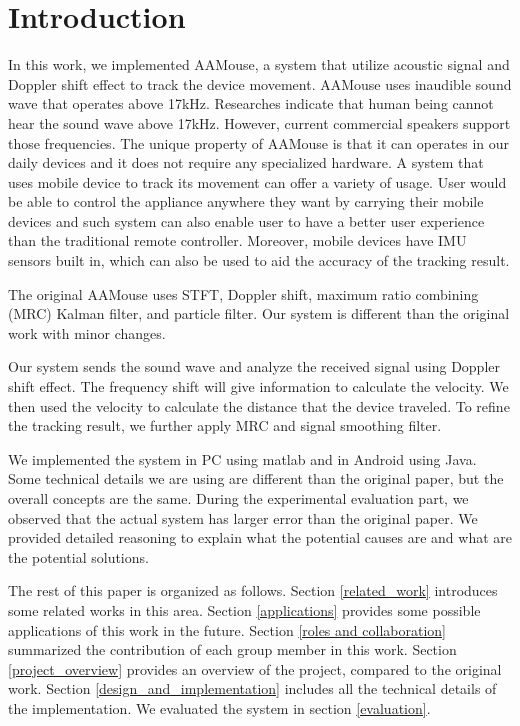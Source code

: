 \documentclass{acm_proc_article-sp}
\begin{document}
\section{Introduction}
In this work, we implemented AAMouse, a system that utilize 
acoustic signal and Doppler shift effect to track the device movement.
AAMouse uses inaudible sound wave that operates above 17kHz.
Researches indicate that human being cannot hear the sound wave above
17kHz. However, current commercial speakers support those frequencies.
The unique property of AAMouse is that it can operates in our daily 
devices and it does not require any specialized hardware. A system
that uses mobile device to track its movement can offer a variety
of usage. User would be able to control the appliance anywhere they
want by carrying their mobile devices and such system can also 
enable user to have a better user experience than the traditional
remote controller. Moreover, mobile devices have IMU sensors built in,
which can also be used to aid the accuracy of the tracking result.

The original AAMouse uses STFT, Doppler shift, maximum ratio 
combining (MRC) Kalman filter, and 
particle filter. Our system is different than the original work with
minor changes. 

Our system sends the sound wave and analyze the received signal using
Doppler shift effect. The frequency shift will give information to 
calculate the velocity. We then used the velocity to calculate the
distance that the device traveled. To refine the tracking result,
we further apply MRC and signal smoothing
filter. 

We implemented the system in PC using matlab and in Android using
Java. Some technical details we are using are different than the 
original paper, but the overall concepts are the same. During the 
experimental evaluation part, we observed that the actual system has
larger error than the original paper.
We provided detailed
reasoning to explain what the potential causes are and what are the
potential solutions.

The rest of this paper is organized as follows. Section
\ref{related_work} introduces some related works in this area.
Section \ref{applications} provides some possible applications of
this work in the future. Section \ref{roles and collaboration}
summarized the contribution of each group member in this work. 
Section \ref{project_overview} provides an overview of the project,
compared to the original work. Section \ref{design_and_implementation}
includes all the technical details of the implementation. We evaluated
the system in section \ref{evaluation}.
\end{document}

